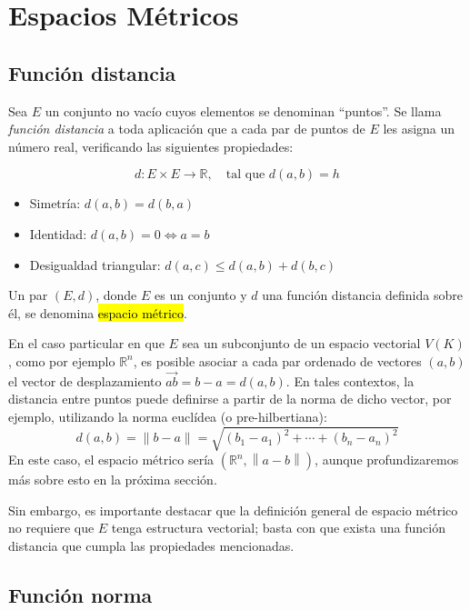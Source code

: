 \section{Espacios Métricos}

\subsection{Función distancia}

Sea \(E\) un conjunto no vacío cuyos elementos se denominan ``puntos''. Se llama \textit{función distancia} a toda aplicación que a cada par de puntos de \(E\) les asigna un número real, verificando las siguientes propiedades:

\[
  d: E \times E \rightarrow \mathbb{R}, \quad \text{tal que } d(a,b) = h
\]

\begin{itemize}
  \item Simetría: \(d(a,b) = d(b,a)\)
  \item Identidad: \(d(a,b) = 0 \iff a=b\)
  \item Desigualdad triangular: \(d(a,c) \leq d(a,b) + d(b,c)\)
\end{itemize}

Un par \((E, d)\), donde \(E\) es un conjunto y \(d\) una función distancia definida sobre él, se denomina \hl{espacio métrico}.

\begin{tcolorbox}[remember, title=Observación]
  En el caso particular en que \(E\) sea un subconjunto de un espacio vectorial \(V(K)\), como por ejemplo \(\mathbb{R}^n\), es posible asociar a cada par ordenado de vectores \((a,b)\) el vector de desplazamiento \(\vec{ab} = b - a = d(a,b)\). En tales contextos, la distancia entre puntos puede definirse a partir de la norma de dicho vector, por ejemplo, utilizando la norma euclídea (o pre-hilbertiana):
  \[
    d(a,b) = \| b - a \| = \sqrt{(b_1 - a_1)^2 + \cdots + (b_n - a_n)^2}
  \]
  En este caso, el espacio métrico sería \(\left(\mathbb{R}^n,\left\lVert a-b \right\rVert \right)\), aunque profundizaremos más sobre esto en la próxima sección.

  Sin embargo, es importante destacar que la definición general de espacio métrico no requiere que \(E\) tenga estructura vectorial; basta con que exista una función distancia que cumpla las propiedades mencionadas.
\end{tcolorbox}

\subsection{Función norma}

